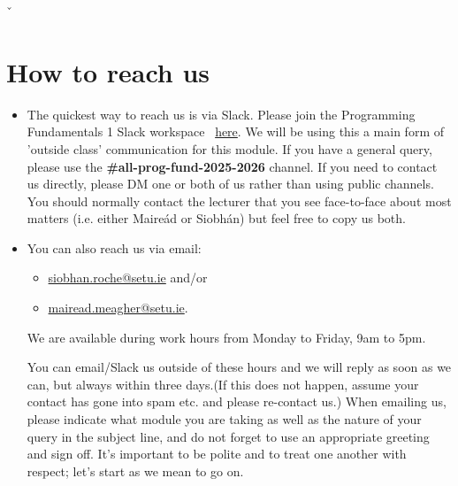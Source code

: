 \documentclass{article}
\begin{document}
ˇ
\section{How to reach us}
\begin{itemize}
    \item The quickest way to reach us  is via Slack. 
    Please join the Programming Fundamentals 1 Slack workspace 
    \ \href{https://join.slack.com/t/progfund2025-2026/shared_invite/zt-3ck6bblib-GPEEFtkNPF0R5Cxoj4wZAQ}{here}. 
    We  will be using this a main form of 'outside class' communication for this module. 
    If you have a general query, please use the \textbf{\#all-prog-fund-2025-2026} channel. 
    If you need to contact us directly, please DM one or both of us rather than using public channels. 
    You should  normally contact the lecturer that you see face-to-face about most matters 
    (i.e. either Maire\'ad or Siobh\'an) but feel free to copy us both. 
    \item You can also reach us  via email:
    \begin{itemize}
        \item \href{mailto:siobhan.roche@setu.ie}{siobhan.roche@setu.ie}   
    and/or \item \href{mailto:mairead.meagher@setu.ie}{mairead.meagher@setu.ie}. 
\end{itemize} We are available during work hours from Monday to Friday, 9am to 5pm. 

    You can email/Slack us outside of these hours and we will reply as soon as we can, 
but always within three days.(If this does not happen, assume your contact has gone into spam etc. 
and please re-contact us.) When emailing us, please indicate what module you are taking as well as 
the nature of your query in the subject line, and do not forget to use an appropriate greeting and sign off. 
It’s important to be polite and to treat one another with 
respect; let’s start as we mean to go on.

   
\end{itemize}
\pagebreak
\end{document}
